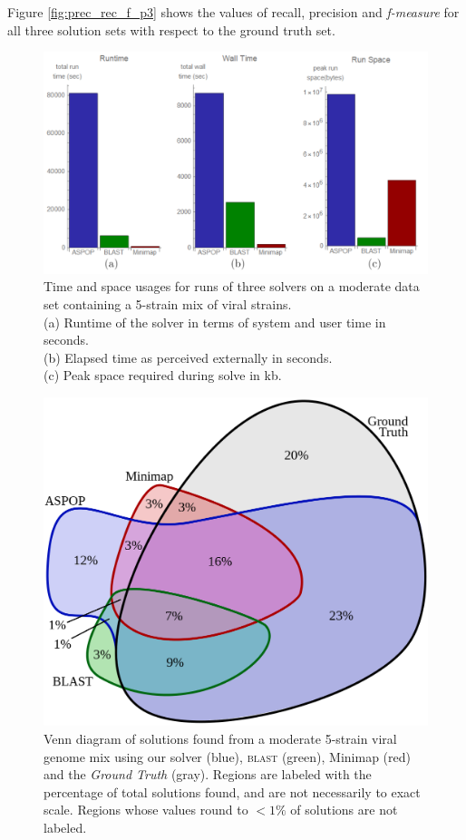 Figure \ref{fig:prec_rec_f_p3} shows the values of recall, precision and \textit{f-measure} for all three solution sets with respect to the ground truth set.

\begin{figure}
\centering
\includegraphics[width=0.85\linewidth]{images/time_space_v.png}
\caption[Time and space usages for runs of three \aspop{} solvers on a moderate data set containing a 5-strain mix of viral strains.]{Time and space usages for runs of three \aspop{} solvers on a moderate data set containing a 5-strain mix of viral strains.\\(a) Runtime of the solver in terms of system and user time in seconds\footnotemark{}.\\(b) Elapsed time as perceived externally in seconds.\\(c) Peak space required during solve in kb.}
\label{fig:viral_timespace}
\end{figure}

\FloatBarrier
{}


\begin{figure}
\centering
\includegraphics[width=0.55\linewidth]{images/viral_venn.png}
\caption[Venn diagram of solutions common between our \aspop{}, \textsc{blast} and Minimap against the \textit{ground truth} set for for a 5-strain viral mix data set]{Venn diagram of solutions found from a moderate 5-strain viral genome mix using our \aspop{} solver (blue), \textsc{blast} (green), Minimap (red) and the \textit{Ground Truth} (gray). Regions are labeled with the percentage of total solutions found, and are not necessarily to exact scale. Regions whose values round to $< 1\%$ of solutions are not labeled.}
\label{fig:viral_venn}
\end{figure}

